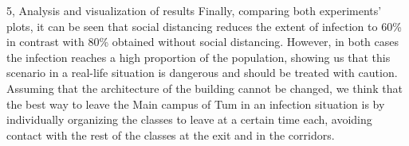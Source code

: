 \begin{task}{5, Analysis and visualization of results}
Finally, comparing both experiments' plots, it can be seen that social distancing reduces the extent of infection to 60\% in contrast with 80\% obtained without social distancing. However, in both cases the infection reaches a high proportion of the population, showing us that this scenario in a real-life situation is dangerous and should be treated with caution. Assuming that the architecture of the building cannot be changed, we think that the best way to leave the Main campus of Tum in an infection situation is by individually organizing the classes to leave at a certain time each, avoiding contact with the rest of the classes at the exit and in the corridors.
\end{task}